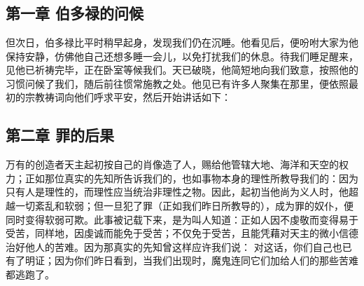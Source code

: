 

\section{}


\subsection{第一章 伯多禄的问候}

但次日，伯多禄比平时稍早起身，发现我们仍在沉睡。他看见后，便吩咐大家为他保持安静，仿佛他自己还想多睡一会儿，以免打扰我们的休息。待我们睡足醒来，见他已祈祷完毕，正在卧室等候我们。天已破晓，他简短地向我们致意，按照他的习惯问候了我们，随后前往惯常施教之处。他见已有许多人聚集在那里，便依照最初的宗教祷词向他们呼求平安，然后开始讲话如下：\par


\subsection{第二章 罪的后果}

万有的创造者天主起初按自己的肖像造了人，赐给他管辖大地、海洋和天空的权力；正如那位真实的先知所告诉我们的，也如事物本身的理性所教导我们的：因为只有人是理性的，而理性应当统治非理性之物。因此，起初当他尚为义人时，他超越一切紊乱和软弱；但一旦犯了罪（正如我们昨日所教导的），成为罪的奴仆，便同时变得软弱可欺。此事被记载下来，是为叫人知道：正如人因不虔敬而变得易于受苦，同样地，因虔诚而能免于受苦；不仅免于受苦，且能凭藉对天主的微小信德治好他人的苦难。因为那真实的先知曾这样应许我们说： 对这话，你们自己也已有了明证；因为你们昨日看到，当我们出现时，魔鬼连同它们加给人们的那些苦难都逃跑了。\par


